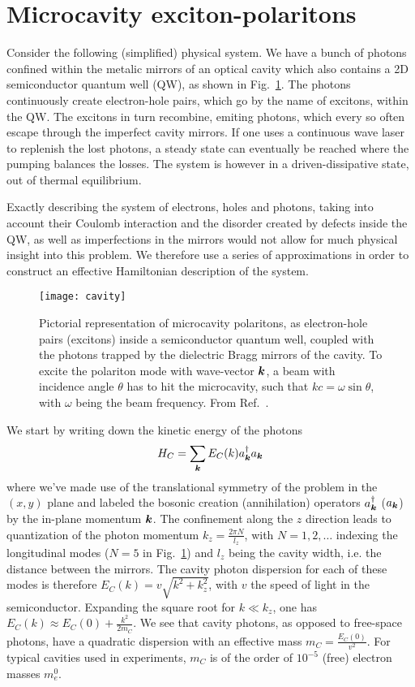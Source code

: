 \section{Microcavity exciton-polaritons}
\label{sec:polaritons}


Consider the following (simplified) physical system. We have a bunch
of photons confined within the metalic mirrors of an optical cavity
which also contains a 2D semiconductor quantum well (QW), as shown in
Fig.~\ref{fig:cavity-polaritons}. The photons continuously create
electron-hole pairs, which go by the name of excitons, within the
QW. The excitons in turn recombine, emiting photons, which every so
often escape through the imperfect cavity mirrors. If one uses a
continuous wave laser to replenish the lost photons, a steady state
can eventually be reached where the pumping balances the losses. The
system is however in a driven-dissipative state, out of thermal
equilibrium.

Exactly describing the system of electrons, holes and photons, taking
into account their Coulomb interaction and the disorder created by
defects inside the QW, as well as imperfections in the mirrors would
not allow for much physical insight into this problem. We therefore
use a series of approximations in order to construct an effective
Hamiltonian description of the system.
%
\begin{figure}[tb]\centering
  \texttt{[image: cavity]}
  \caption{
    Pictorial representation of microcavity polaritons, as electron-hole pairs (excitons) inside a semiconductor quantum well, 
coupled with the photons trapped by the dielectric Bragg mirrors of the cavity. To excite the polariton mode with wave-vector $\bm{k}$, a beam with incidence angle $\theta$ has to hit the microcavity, such that $k c = \omega \sin\theta$, with $\omega$ being the beam frequency.
From Ref.~\cite{Kasprzak_2006}.
}\label{fig:cavity-polaritons}
\end{figure}
% 
We start by writing down the kinetic energy of the photons
%
\begin{equation}\label{eq:cavity-energy}
  H_{C} = \sum_{\bm{k}} E_C(k) a_{\bm{k}}^{\dagger} a_{\bm{k}}
\end{equation}
% 
where we've made use of the translational symmetry of the problem in
the $(x,y)$ plane and labeled the bosonic creation (annihilation)
operators $a_{\bm{k}}^{\dagger}$ ($a_{\bm{k}}$) by the in-plane momentum
$\bm{k}$. The confinement along the $z$ direction leads to quantization
of the photon momentum $k_z = \frac{2 \pi N}{l_z}$, with
$N = 1,2,\dots$ indexing the longitudinal modes ($N=5$ in
Fig.~\ref{fig:cavity-polaritons}) and $l_z$ being the cavity width,
i.e. the distance between the mirrors. The cavity photon dispersion
for each of these modes is therefore $E_C(k) = v \sqrt{k^2 + k_z^2}$,
with $v$ the speed of light in the semiconductor. Expanding the square
root for $k \ll k_z$, one has
$E_C(k) \approx E_C(0) + \frac{k^2}{2m_{C}}$. We see that
cavity photons, as opposed to free-space photons, have a quadratic
dispersion with an effective mass
$m_{C} = \frac{E_C(0)}{v^2}$. For typical cavities used in
experiments, $m_{C}$ is of the order of $10^{-5}$ (free)
electron masses $m_e^0$.

